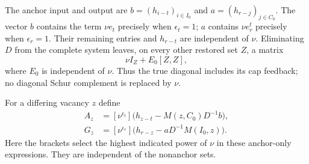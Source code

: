 \documentclass[11pt,a4paper]{amsart}
\numberwithin{equation}{section}
\theoremstyle{plain}
\theoremstyle{definition}
\begin{document}
The anchor input and output are
\(b=(h_{i-t})_{i\in I_0}\) and \(a=(h_{r-j})_{j\in C_0}\).
The vector \(b\) contains the term \(\nu e_t\) precisely when \(\epsilon_t=1\);
\(a\) contains \(\nu e_r^t\) precisely when \(\epsilon_r=1\).  Their remaining
entries and \(h_{r-t}\) are independent of \(\nu\).  Eliminating \(D\) from the
complete system leaves, on every other restored set \(Z\), a matrix
\begin{equation}\label{eq:contact-coherent-block}
 \nu I_Z+E_0[Z,Z],
\end{equation}
where \(E_0\) is independent of \(\nu\).  Thus the true diagonal includes its
cap feedback; no diagonal Schur complement is replaced by \(\nu\).

For a differing vacancy \(z\) define
\begin{equation}
\begin{aligned}
 A_z&=[\nu^{\epsilon_t}]
   \bigl(h_{z-t}-M(z,C_0)D^{-1}b\bigr),\\
 G_z&=[\nu^{\epsilon_r}]
   \bigl(h_{r-z}-aD^{-1}M(I_0,z)\bigr).
\end{aligned}
 \label{eq:contact-anchor-forcing}
\end{equation}
Here the brackets select the highest indicated power of \(\nu\) in these
anchor-only expressions.  They are independent of the nonanchor sets.
\end{document}
